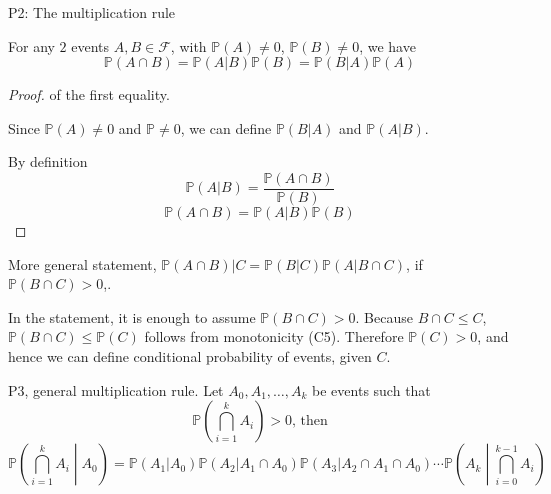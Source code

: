 \documentclass[10pt, a4paper]{article}
\begin{document}
P2: The multiplication rule

For any $2$ events $A, B \in \mathcal{F}$, with $\mathbb{P}(A) \neq 0$, $\mathbb{P}(B) \neq 0$, we have
\[
\mathbb{P}(A \cap B) = \mathbb{P}(A | B)\mathbb{P}(B) = \mathbb{P}(B | A)\mathbb{P}(A)
\]
\begin{proof}
    of the first equality.
    
    Since $\mathbb{P}(A) \neq 0$ and $\mathbb{P} \neq 0$, we can define $\mathbb{P}(B | A)$ and $\mathbb{P}(A | B)$.

    By definition
    \[
    \mathbb{P}(A | B) = \frac{\mathbb{P}(A \cap B)}{\mathbb{P}(B)}
    \]
    \[
    \mathbb{P}(A \cap B) = \mathbb{P}(A | B)\mathbb{P}(B)
    \]
\end{proof}

More general statement, $\mathbb{P}(A \cap B) | C = \mathbb{P}(B | C)\mathbb{P}(A | B \cap C)$, if $\mathbb{P}(B \cap C) > 0$,.

In the statement, it is enough to assume $\mathbb{P}(B \cap C) > 0$. Because $B \cap C \leq C$, $\mathbb{P}(B \cap C) \leq \mathbb{P}(C)$ follows from monotonicity (C5). Therefore $\mathbb{P}(C) > 0$, and hence we can define conditional probability of events, given $C$.

P3, general multiplication rule. Let $A_0, A_1, \dotsc, A_k$ be events such that
\[
\mathbb{P}\left(\bigcap_{i = 1}^{k}A_i\right) > 0\text{, then}
\]
\[
\mathbb{P}\left(\bigcap_{i = 1}^{k}A_i \middle| A_0\right) = \mathbb{P}(A_1 | A_0)\mathbb{P}(A_2 | A_1 \cap A_0)\mathbb{P}(A_3 | A_2 \cap A_1 \cap A_0) \dotsi \mathbb{P}\left(A_k \middle| \bigcap_{i = 0}^{k - 1}A_i\right)
\]
\end{document}
